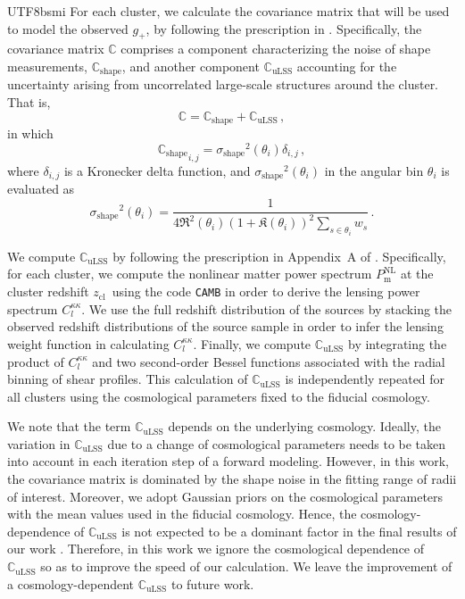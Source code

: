 \documentclass[longauth]{aa}
\newcommand{\zcl}{\ensuremath{z_{\mathrm{cl}}}}
\newcommand{\gshear}{\ensuremath{g_{+}}}
\newcommand{\lensingw}{\ensuremath{w}}
\newcommand{\sigmashape}{\ensuremath{\sigma_{\mathrm{shape}}}}
\begin{document}
\begin{CJK*}{UTF8}{bsmi}
For each cluster, we calculate the covariance matrix that will be used to model the observed \gshear, by following the prescription in \cite{umetsu20}.
Specifically, the covariance matrix $\mathbb{C}$ comprises a component characterizing the noise of shape measurements, $\mathbb{C}_{\mathrm{shape}}$, and another component $\mathbb{C}_{\mathrm{uLSS}}$ accounting for the uncertainty arising from uncorrelated large-scale structures around the cluster.
That is, 
%
\begin{equation}
\label{eq:covlensing}
\mathbb{C} = \mathbb{C}_{\mathrm{shape}} + \mathbb{C}_{\mathrm{uLSS}}
\, ,
\end{equation}
%
in which
\[
{\mathbb{C}_{\mathrm{shape}}}_{i,j} = \sigmashape^2(\theta_{i}) \delta_{i,j} \, ,
\]
where $\delta_{i,j}$ is a Kronecker delta function, and ${\sigmashape}^2(\theta_{i})$ in the angular bin $\theta_{i}$ is evaluated as
%
\begin{equation}
\label{eq:shapenoise}
\sigmashape^2(\theta_{i}) = \frac{
1
}{
4\mathfrak{R}^2(\theta_{i})\left(1 + \mathfrak{K}(\theta_{i})\right)^2 \sum\limits_{s\in \theta_{i}} {\lensingw}_{s}
}
\, .
\end{equation}
%


We compute $\mathbb{C}_{\mathrm{uLSS}}$ by following the prescription in Appendix~A of \cite{miyatake19} \citep[see also][]{hoekstra03}.
Specifically, for each cluster, we compute the nonlinear matter power spectrum $P^{\mathrm{NL}}_{\mathrm{m}}$ at the cluster redshift \zcl\   using the code \texttt{CAMB} \citep{lewis99} in order to derive the lensing power spectrum $C_{l}^{\kappa\kappa}$.
We use the full redshift distribution of the sources by stacking the observed redshift distributions of the source sample in order to infer the lensing weight function in calculating $C_{l}^{\kappa\kappa}$.
Finally, we compute $\mathbb{C}_{\mathrm{uLSS}}$ by integrating the product of $C_{l}^{\kappa\kappa}$ and two second-order Bessel functions associated with the radial binning of shear profiles.
This calculation of $\mathbb{C}_{\mathrm{uLSS}}$ is independently repeated for all clusters using the cosmological parameters fixed to the fiducial cosmology.

We note that the term $\mathbb{C}_{\mathrm{uLSS}}$ depends on the underlying cosmology.
Ideally, the variation in $\mathbb{C}_{\mathrm{uLSS}}$ due to a change of cosmological parameters needs to be taken into account in each iteration step of a forward modeling.
However, in this work, the covariance matrix is dominated by the shape noise in the fitting range of radii of interest.
Moreover, we adopt Gaussian priors on the cosmological parameters with the mean values used in the fiducial cosmology.
Hence, the cosmology-dependence of $\mathbb{C}_{\mathrm{uLSS}}$ is not expected to be a dominant factor in the final results of our work \citep[see][]{kodwani19}. 
Therefore, in this work we ignore the cosmological dependence of $\mathbb{C}_{\mathrm{uLSS}}$ so as to improve the speed of our calculation.
We leave the improvement of a cosmology-dependent $\mathbb{C}_{\mathrm{uLSS}}$ to future work.



\end{CJK*}
\end{document}
